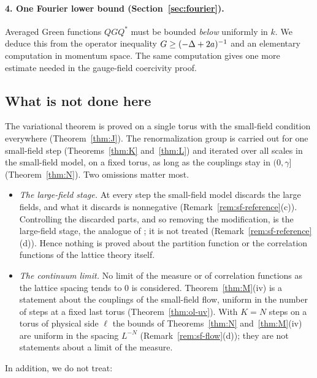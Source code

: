 \paragraph{4. One Fourier lower bound (Section~\ref{sec:fourier}).} Averaged Green functions $QGQ^*$ must be bounded \emph{below} uniformly in $k$. We deduce this from the operator inequality $G\ge(-\Delta+2a)^{-1}$ and an elementary computation in momentum space. The same computation gives one more estimate needed in the gauge-field coercivity proof.

\subsection{What is not done here}\label{ss:1.5}

The variational theorem is proved on a single torus with the small-field condition everywhere (Theorem~\ref{thm:J}). The renormalization group is carried out for one small-field step (Theorems~\ref{thm:K} and~\ref{thm:L}) and iterated over all scales in the small-field model, on a fixed torus, as long as the couplings stay in $(0,\gamma]$ (Theorem~\ref{thm:N}). Two omissions matter most.
\begin{itemize}
\item \emph{The large-field stage.} At every step the small-field model discards the large fields, and what it discards is nonnegative (Remark~\ref{rem:sf-reference}(c)). Controlling the discarded parts, and so removing the modification, is the large-field stage, the analogue of \cite{DimockII,DimockIII}; it is not treated (Remark~\ref{rem:sf-reference}(d)). Hence nothing is proved about the partition function or the correlation functions of the lattice theory itself.
\item \emph{The continuum limit.} No limit of the measure or of correlation functions as the lattice spacing tends to $0$ is considered. Theorem~\ref{thm:M}(iv) is a statement about the couplings of the small-field flow, uniform in the number of steps at a fixed last torus (Theorem~\ref{thm:ol-uv}). With $K=N$ steps on a torus of physical side $\ell$ the bounds of Theorems~\ref{thm:N} and~\ref{thm:M}(iv) are uniform in the spacing $L^{-N}$ (Remark~\ref{rem:sf-flow}(d)); they are not statements about a limit of the measure.
\end{itemize}
In addition, we do not treat:
